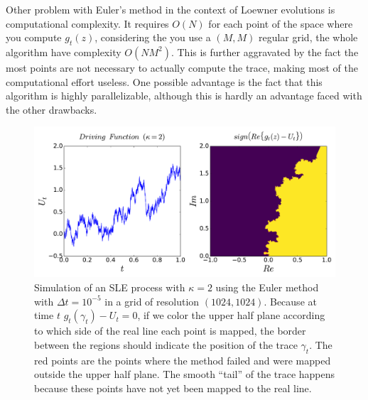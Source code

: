 Other problem with Euler's method in the context of Loewner evolutions is
computational complexity. It requires $O(N)$ for each point of the space where
you compute $g_t(z)$, considering the you use a $(M,M)$ regular grid, the whole
algorithm have complexity $O(NM^2)$. This is further aggravated by the fact the
most points are not necessary to actually compute the trace, making most of the
computational effort useless. One possible advantage is the fact that this
algorithm is highly parallelizable, although this is hardly an advantage faced
with the other drawbacks.

\begin{figure}
\begin{center}
    \includegraphics[scale=0.45]{chapters/ch4-sle/figs/euler1}
\end{center}
\caption{Simulation of an SLE process with $\kappa=2$ using the Euler method
    with $\Delta t = 10^{-5}$ in a grid of resolution $(1024, 1024)$. Because
    at time $t$ $g_t(\gamma_t)-U_t=0$, if we color the upper half plane
    according to which side of the real line each point is mapped, the border
    between the regions should indicate the position of the trace $\gamma_t$.
    The red points are the points where the method failed and were mapped
    outside the upper half plane. The smooth ``tail'' of the trace happens
    because these points have not yet been mapped to the real line.}
\label{fig:euler1}
\end{figure}

